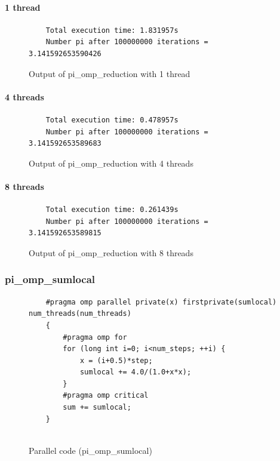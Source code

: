 \documentclass[12pt, a4paper]{article}
\begin{document}
\paragraph{1 thread}

\begin{figure}[H]
	\begin{lstlisting}
	Total execution time: 1.831957s
	Number pi after 100000000 iterations = 3.141592653590426		
	\end{lstlisting}
	\caption{Output of pi\_omp\_reduction with 1 thread}
\end{figure}

\paragraph{4 threads}

\begin{figure}[H]
	\begin{lstlisting}
	Total execution time: 0.478957s
	Number pi after 100000000 iterations = 3.141592653589683			
	\end{lstlisting}
	\caption{Output of pi\_omp\_reduction with 4 threads}
\end{figure}

\paragraph{8 threads}

\begin{figure}[H]
	\begin{lstlisting}
	Total execution time: 0.261439s
	Number pi after 100000000 iterations = 3.141592653589815
	\end{lstlisting}
	\caption{Output of pi\_omp\_reduction with 8 threads}
\end{figure}

\subsubsection{pi\_omp\_sumlocal}

\begin{figure}[H]
	\begin{lstlisting}
	#pragma omp parallel private(x) firstprivate(sumlocal) num_threads(num_threads)
    {
        #pragma omp for 
        for (long int i=0; i<num_steps; ++i) {
            x = (i+0.5)*step;
            sumlocal += 4.0/(1.0+x*x);
        }
        #pragma omp critical 
		sum += sumlocal;
    }


	\end{lstlisting}
	
	\caption{Parallel code (pi\_omp\_sumlocal)}
\end{figure}
\end{document}
